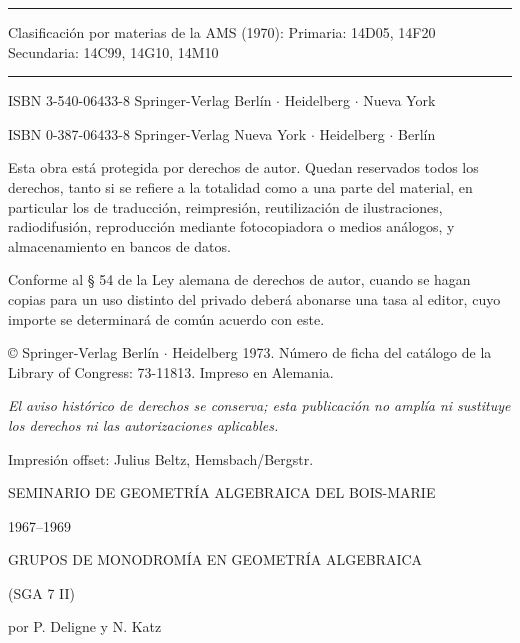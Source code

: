 \clearpage
\thispagestyle{empty}
\null\vfill
{\small
\begin{center}
\hrule\medskip
Clasificación por materias de la AMS (1970): Primaria: 14D05, 14F20\\
Secundaria: 14C99, 14G10, 14M10
\medskip\hrule
\end{center}

\medskip
\noindent ISBN 3-540-06433-8 Springer-Verlag Berlín $\cdot$ Heidelberg $\cdot$ Nueva York\par
\noindent ISBN 0-387-06433-8 Springer-Verlag Nueva York $\cdot$ Heidelberg $\cdot$ Berlín\par

\medskip
\noindent Esta obra está protegida por derechos de autor. Quedan reservados todos los derechos, tanto si se refiere a la totalidad como a una parte del material, en particular los de traducción, reimpresión, reutilización de ilustraciones, radiodifusión, reproducción mediante fotocopiadora o medios análogos, y almacenamiento en bancos de datos.\par
\noindent Conforme al § 54 de la Ley alemana de derechos de autor, cuando se hagan copias para un uso distinto del privado deberá abonarse una tasa al editor, cuyo importe se determinará de común acuerdo con este.\par
\noindent © Springer-Verlag Berlín $\cdot$ Heidelberg 1973. Número de ficha del catálogo de la Library of Congress: 73-11813. Impreso en Alemania.\par

\medskip
\noindent\textit{El aviso histórico de derechos se conserva; esta publicación no amplía ni sustituye los derechos ni las autorizaciones aplicables.}\par

\medskip
\noindent Impresión offset: Julius Beltz, Hemsbach/Bergstr.\par
}
\vfill\null

\clearpage
\thispagestyle{empty}
\begin{center}
{\Large SEMINARIO DE GEOMETRÍA ALGEBRAICA DEL BOIS-MARIE\par}
\vspace{1.5em}
{\large 1967--1969\par}
\vspace{4em}
{\Large GRUPOS DE MONODROMÍA EN GEOMETRÍA ALGEBRAICA\par}
\vspace{1.5em}
{\Large (SGA 7 II)\par}
\vspace{5em}
{\large por P. Deligne y N. Katz\par}
\end{center}
\clearpage

